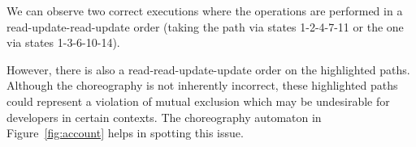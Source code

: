 We can observe two correct executions where the operations are
performed in a read-update-read-update order (taking the path via
states 1-2-4-7-11 or the one via states 1-3-6-10-14).
%

However, there is also a read-read-update-update order on the
highlighted paths.
%
Although the choreography is not inherently incorrect, these
highlighted paths could represent a violation of mutual exclusion
which may be undesirable for developers in certain
contexts.
The choreography automaton in Figure~\ref{fig:account} helps in spotting
this issue.

